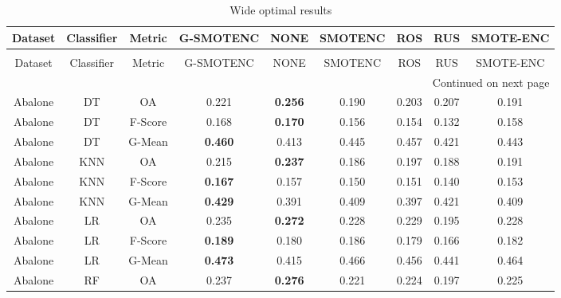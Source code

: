 \begin{longtable}{ccccccccc}
\caption{Wide optimal results}
\label{tbl:wide_optimal}\\
\toprule
           Dataset & Classifier &  Metric &      G-SMOTENC &           NONE &        SMOTENC &            ROS &            RUS &      SMOTE-ENC \\
\midrule
\endfirsthead
\caption[]{Wide optimal results} \\
\toprule
           Dataset & Classifier &  Metric &      G-SMOTENC &           NONE &        SMOTENC &            ROS &            RUS &      SMOTE-ENC \\
\midrule
\endhead
\midrule
\multicolumn{9}{r}{{Continued on next page}} \\
\midrule
\endfoot

\bottomrule
\endlastfoot
           Abalone &         DT &      OA &          0.221 & \textbf{0.256} &          0.190 &          0.203 &          0.207 &          0.191 \\
           Abalone &         DT & F-Score &          0.168 & \textbf{0.170} &          0.156 &          0.154 &          0.132 &          0.158 \\
           Abalone &         DT &  G-Mean & \textbf{0.460} &          0.413 &          0.445 &          0.457 &          0.421 &          0.443 \\
           Abalone &        KNN &      OA &          0.215 & \textbf{0.237} &          0.186 &          0.197 &          0.188 &          0.191 \\
           Abalone &        KNN & F-Score & \textbf{0.167} &          0.157 &          0.150 &          0.151 &          0.140 &          0.153 \\
           Abalone &        KNN &  G-Mean & \textbf{0.429} &          0.391 &          0.409 &          0.397 &          0.421 &          0.409 \\
           Abalone &         LR &      OA &          0.235 & \textbf{0.272} &          0.228 &          0.229 &          0.195 &          0.228 \\
           Abalone &         LR & F-Score & \textbf{0.189} &          0.180 &          0.186 &          0.179 &          0.166 &          0.182 \\
           Abalone &         LR &  G-Mean & \textbf{0.473} &          0.415 &          0.466 &          0.456 &          0.441 &          0.464 \\
           Abalone &         RF &      OA &          0.237 & \textbf{0.276} &          0.221 &          0.224 &          0.197 &          0.225 \\

\end{longtable}
